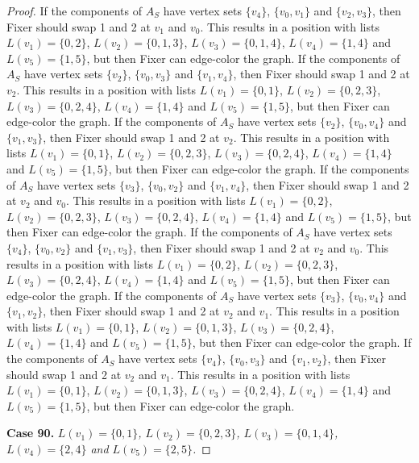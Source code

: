 \documentclass[12pt]{amsart}
\theoremstyle{plain}
\theoremstyle{definition}
\theoremstyle{remark}
\begin{document}
\begin{proof}
If the components of $A_S$ have vertex sets $\{v_4\}$, $\{v_0, v_1\}$ and $\{v_2, v_3\}$, then Fixer should swap 1 and 2 at $v_1$ and $v_0$. This results in a position with lists $L(v_1) = \{0, 2\}$, $L(v_2) = \{0, 1, 3\}$, $L(v_3) = \{0, 1, 4\}$, $L(v_4) = \{1, 4\}$ and $L(v_5) = \{1, 5\}$, but then Fixer can edge-color the graph.
If the components of $A_S$ have vertex sets $\{v_2\}$, $\{v_0, v_3\}$ and $\{v_1, v_4\}$, then Fixer should swap 1 and 2 at $v_2$. This results in a position with lists $L(v_1) = \{0, 1\}$, $L(v_2) = \{0, 2, 3\}$, $L(v_3) = \{0, 2, 4\}$, $L(v_4) = \{1, 4\}$ and $L(v_5) = \{1, 5\}$, but then Fixer can edge-color the graph.
If the components of $A_S$ have vertex sets $\{v_2\}$, $\{v_0, v_4\}$ and $\{v_1, v_3\}$, then Fixer should swap 1 and 2 at $v_2$. This results in a position with lists $L(v_1) = \{0, 1\}$, $L(v_2) = \{0, 2, 3\}$, $L(v_3) = \{0, 2, 4\}$, $L(v_4) = \{1, 4\}$ and $L(v_5) = \{1, 5\}$, but then Fixer can edge-color the graph.
If the components of $A_S$ have vertex sets $\{v_3\}$, $\{v_0, v_2\}$ and $\{v_1, v_4\}$, then Fixer should swap 1 and 2 at $v_2$ and $v_0$. This results in a position with lists $L(v_1) = \{0, 2\}$, $L(v_2) = \{0, 2, 3\}$, $L(v_3) = \{0, 2, 4\}$, $L(v_4) = \{1, 4\}$ and $L(v_5) = \{1, 5\}$, but then Fixer can edge-color the graph.
If the components of $A_S$ have vertex sets $\{v_4\}$, $\{v_0, v_2\}$ and $\{v_1, v_3\}$, then Fixer should swap 1 and 2 at $v_2$ and $v_0$. This results in a position with lists $L(v_1) = \{0, 2\}$, $L(v_2) = \{0, 2, 3\}$, $L(v_3) = \{0, 2, 4\}$, $L(v_4) = \{1, 4\}$ and $L(v_5) = \{1, 5\}$, but then Fixer can edge-color the graph.
If the components of $A_S$ have vertex sets $\{v_3\}$, $\{v_0, v_4\}$ and $\{v_1, v_2\}$, then Fixer should swap 1 and 2 at $v_2$ and $v_1$. This results in a position with lists $L(v_1) = \{0, 1\}$, $L(v_2) = \{0, 1, 3\}$, $L(v_3) = \{0, 2, 4\}$, $L(v_4) = \{1, 4\}$ and $L(v_5) = \{1, 5\}$, but then Fixer can edge-color the graph.
If the components of $A_S$ have vertex sets $\{v_4\}$, $\{v_0, v_3\}$ and $\{v_1, v_2\}$, then Fixer should swap 1 and 2 at $v_2$ and $v_1$. This results in a position with lists $L(v_1) = \{0, 1\}$, $L(v_2) = \{0, 1, 3\}$, $L(v_3) = \{0, 2, 4\}$, $L(v_4) = \{1, 4\}$ and $L(v_5) = \{1, 5\}$, but then Fixer can edge-color the graph.

\noindent\textbf{Case 90.  }\textit{$L(v_1) = \{0, 1\}$, $L(v_2) = \{0, 2, 3\}$, $L(v_3) = \{0, 1, 4\}$, $L(v_4) = \{2, 4\}$ and $L(v_5) = \{2, 5\}$.}


\end{proof}
\end{document}
